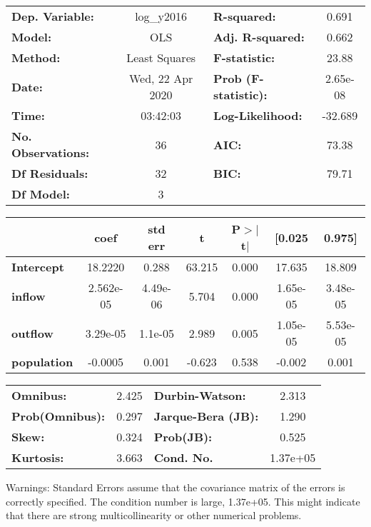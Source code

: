 \begin{center}
\begin{tabular}{lclc}
\toprule
\textbf{Dep. Variable:}    &    log\_y2016    & \textbf{  R-squared:         } &     0.691   \\
\textbf{Model:}            &       OLS        & \textbf{  Adj. R-squared:    } &     0.662   \\
\textbf{Method:}           &  Least Squares   & \textbf{  F-statistic:       } &     23.88   \\
\textbf{Date:}             & Wed, 22 Apr 2020 & \textbf{  Prob (F-statistic):} &  2.65e-08   \\
\textbf{Time:}             &     03:42:03     & \textbf{  Log-Likelihood:    } &   -32.689   \\
\textbf{No. Observations:} &          36      & \textbf{  AIC:               } &     73.38   \\
\textbf{Df Residuals:}     &          32      & \textbf{  BIC:               } &     79.71   \\
\textbf{Df Model:}         &           3      & \textbf{                     } &             \\
\bottomrule
\end{tabular}
\begin{tabular}{lcccccc}
                    & \textbf{coef} & \textbf{std err} & \textbf{t} & \textbf{P$> |$t$|$} & \textbf{[0.025} & \textbf{0.975]}  \\
\midrule
\textbf{Intercept}  &      18.2220  &        0.288     &    63.215  &         0.000        &       17.635    &       18.809     \\
\textbf{inflow}     &    2.562e-05  &     4.49e-06     &     5.704  &         0.000        &     1.65e-05    &     3.48e-05     \\
\textbf{outflow}    &     3.29e-05  &      1.1e-05     &     2.989  &         0.005        &     1.05e-05    &     5.53e-05     \\
\textbf{population} &      -0.0005  &        0.001     &    -0.623  &         0.538        &       -0.002    &        0.001     \\
\bottomrule
\end{tabular}
\begin{tabular}{lclc}
\textbf{Omnibus:}       &  2.425 & \textbf{  Durbin-Watson:     } &    2.313  \\
\textbf{Prob(Omnibus):} &  0.297 & \textbf{  Jarque-Bera (JB):  } &    1.290  \\
\textbf{Skew:}          &  0.324 & \textbf{  Prob(JB):          } &    0.525  \\
\textbf{Kurtosis:}      &  3.663 & \textbf{  Cond. No.          } & 1.37e+05  \\
\bottomrule
\end{tabular}
\end{center}

Warnings: \newline
 [1] Standard Errors assume that the covariance matrix of the errors is correctly specified. \newline
 [2] The condition number is large, 1.37e+05. This might indicate that there are \newline
 strong multicollinearity or other numerical problems.